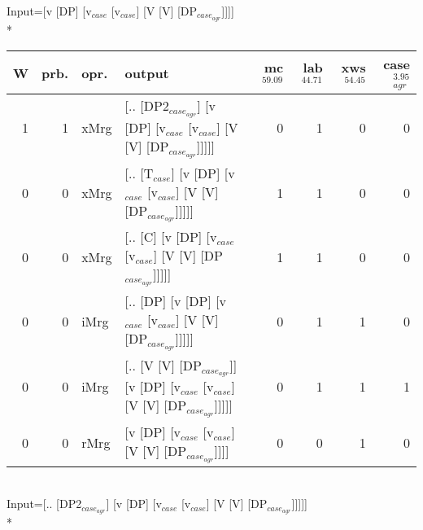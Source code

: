 \begingroup\scriptsize Input=[v [DP] [v$_{case}$ [v$_{case}$] [V [V] [DP$_{case_{agr}}$]]]]\\*
\begin{tabularx}{\linewidth}{rrlXrrrr}
\hline
   W &   prb. & opr.   & output                                                                      &   mc$^{59.09}$ &   lab$^{44.71}$ &   xws$^{54.45}$ &   case$_{agr}^{3.95}$ \\
\hline
   1 &   1 & xMrg & [.. [DP2$_{case_{agr}}$] [v [DP] [v$_{case}$ [v$_{case}$] [V [V] [DP$_{case_{agr}}$]]]]]        &            0 &             1 &             0 &                  0 \\
   0 &   0 & xMrg & [.. [T$_{case}$] [v [DP] [v$_{case}$ [v$_{case}$] [V [V] [DP$_{case_{agr}}$]]]]]              &            1 &             1 &             0 &                  0 \\
   0 &   0 & xMrg & [.. [C] [v [DP] [v$_{case}$ [v$_{case}$] [V [V] [DP$_{case_{agr}}$]]]]]                   &            1 &             1 &             0 &                  0 \\
   0 &   0 & iMrg & [.. [DP] [v [DP] [v$_{case}$ [v$_{case}$] [V [V] [DP$_{case_{agr}}$]]]]]                  &            0 &             1 &             1 &                  0 \\
   0 &   0 & iMrg & [.. [V [V] [DP$_{case_{agr}}$]] [v [DP] [v$_{case}$ [v$_{case}$] [V [V] [DP$_{case_{agr}}$]]]]] &            0 &             1 &             1 &                  1 \\
   0 &   0 & rMrg & [v [DP] [v$_{case}$ [v$_{case}$] [V [V] [DP$_{case_{agr}}$]]]]                            &            0 &             0 &             1 &                  0 \\
\hline
\end{tabularx}\endgroup\\
\begingroup\scriptsize Input=[.. [DP2$_{case_{agr}}$] [v [DP] [v$_{case}$ [v$_{case}$] [V [V] [DP$_{case_{agr}}$]]]]]\\*
